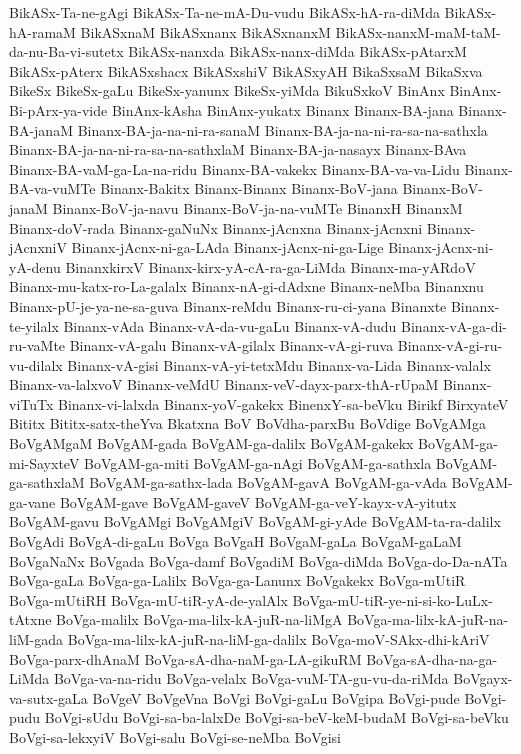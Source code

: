 {BikASx-Ta-ne-gAgi
BikASx-Ta-ne-mA-Du-vudu
BikASx-hA-ra-diMda
BikASx-hA-ramaM
BikASxnaM
BikASxnanx
BikASxnanxM
BikASx-nanxM-maM-taM-da-nu-Ba-vi-sutetx
BikASx-nanxda
BikASx-nanx-diMda
BikASx-pAtarxM
BikASx-pAterx
BikASxshacx
BikASxshiV
BikASxyAH
BikaSxsaM
BikaSxva
BikeSx
BikeSx-gaLu
BikeSx-yanunx
BikeSx-yiMda
BikuSxkoV
BinAnx
BinAnx-Bi-pArx-ya-vide
BinAnx-kAsha
BinAnx-yukatx
Binanx
Binanx-BA-jana
Binanx-BA-janaM
Binanx-BA-ja-na-ni-ra-sanaM
Binanx-BA-ja-na-ni-ra-sa-na-sathxla
Binanx-BA-ja-na-ni-ra-sa-na-sathxlaM
Binanx-BA-ja-nasayx
Binanx-BAva
Binanx-BA-vaM-ga-La-na-ridu
Binanx-BA-vakekx
Binanx-BA-va-va-Lidu
Binanx-BA-va-vuMTe
Binanx-Bakitx
Binanx-Binanx
Binanx-BoV-jana
Binanx-BoV-janaM
Binanx-BoV-ja-navu
Binanx-BoV-ja-na-vuMTe
BinanxH
BinanxM
Binanx-doV-rada
Binanx-gaNuNx
Binanx-jAcnxna
Binanx-jAcnxni
Binanx-jAcnxniV
Binanx-jAcnx-ni-ga-LAda
Binanx-jAcnx-ni-ga-Lige
Binanx-jAcnx-ni-yA-denu
BinanxkirxV
Binanx-kirx-yA-cA-ra-ga-LiMda
Binanx-ma-yARdoV
Binanx-mu-katx-ro-La-galalx
Binanx-nA-gi-dAdxne
Binanx-neMba
Binanxnu
Binanx-pU-je-ya-ne-sa-guva
Binanx-reMdu
Binanx-ru-ci-yana
Binanxte
Binanx-te-yilalx
Binanx-vAda
Binanx-vA-da-vu-gaLu
Binanx-vA-dudu
Binanx-vA-ga-di-ru-vaMte
Binanx-vA-galu
Binanx-vA-gilalx
Binanx-vA-gi-ruva
Binanx-vA-gi-ru-vu-dilalx
Binanx-vA-gisi
Binanx-vA-yi-tetxMdu
Binanx-va-Lida
Binanx-valalx
Binanx-va-lalxvoV
Binanx-veMdU
Binanx-veV-dayx-parx-thA-rUpaM
Binanx-viTuTx
Binanx-vi-lalxda
Binanx-yoV-gakekx
BinenxY-sa-beVku
Birikf
BirxyateV
Bititx
Bititx-satx-theYva
Bkatxna
BoV
BoVdha-parxBu
BoVdige
BoVgAMga
BoVgAMgaM
BoVgAM-gada
BoVgAM-ga-dalilx
BoVgAM-gakekx
BoVgAM-ga-mi-SayxteV
BoVgAM-ga-miti
BoVgAM-ga-nAgi
BoVgAM-ga-sathxla
BoVgAM-ga-sathxlaM
BoVgAM-ga-sathx-lada
BoVgAM-gavA
BoVgAM-ga-vAda
BoVgAM-ga-vane
BoVgAM-gave
BoVgAM-gaveV
BoVgAM-ga-veY-kayx-vA-yitutx
BoVgAM-gavu
BoVgAMgi
BoVgAMgiV
BoVgAM-gi-yAde
BoVgAM-ta-ra-dalilx
BoVgAdi
BoVgA-di-gaLu
BoVga
BoVgaH
BoVgaM-gaLa
BoVgaM-gaLaM
BoVgaNaNx
BoVgada
BoVga-damf
BoVgadiM
BoVga-diMda
BoVga-do-Da-nATa
BoVga-gaLa
BoVga-ga-Lalilx
BoVga-ga-Lanunx
BoVgakekx
BoVga-mUtiR
BoVga-mUtiRH
BoVga-mU-tiR-yA-de-yalAlx
BoVga-mU-tiR-ye-ni-si-ko-LuLx-tAtxne
BoVga-malilx
BoVga-ma-lilx-kA-juR-na-liMgA
BoVga-ma-lilx-kA-juR-na-liM-gada
BoVga-ma-lilx-kA-juR-na-liM-ga-dalilx
BoVga-moV-SAkx-dhi-kAriV
BoVga-parx-dhAnaM
BoVga-sA-dha-naM-ga-LA-gikuRM
BoVga-sA-dha-na-ga-LiMda
BoVga-va-na-ridu
BoVga-velalx
BoVga-vuM-TA-gu-vu-da-riMda
BoVgayx-va-sutx-gaLa
BoVgeV
BoVgeVna
BoVgi
BoVgi-gaLu
BoVgipa
BoVgi-pude
BoVgi-pudu
BoVgi-sUdu
BoVgi-sa-ba-lalxDe
BoVgi-sa-beV-keM-budaM
BoVgi-sa-beVku
BoVgi-sa-lekxyiV
BoVgi-salu
BoVgi-se-neMba
BoVgisi
}
